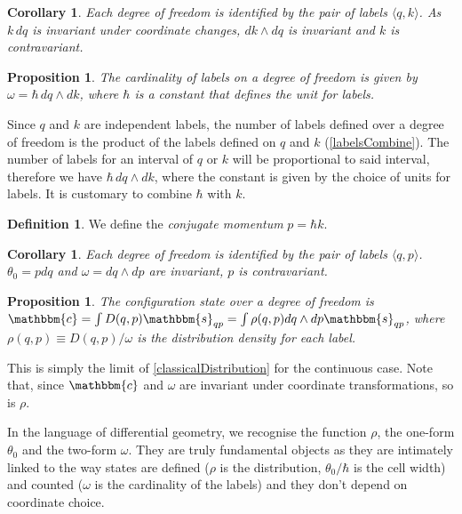 \documentclass[aps,pra,10pt,twocolumn,floatfix,nofootinbib]{revtex4-1}
\newtheorem{cor}[thm]{Corollary}
\newtheorem{prop}[thm]{Proposition}
\theoremstyle{definition}
\newtheorem{defn}[thm]{Definition}
\begin{document}
\begin{cor}\label{continuousLabels}
Each degree of freedom is identified by the pair of labels $\langle q,k \rangle$. As $k\,dq$ is invariant under coordinate changes, $dk\wedge dq$ is invariant and $k$ is contravariant.
\end{cor}

\begin{prop}\label{continuousLabels}
The cardinality of labels on a degree of freedom is given by $\omega = \hbar \, dq \wedge dk$, where $\hbar$ is a constant that defines the unit for labels.
\end{prop}

Since $q$ and $k$ are independent labels, the number of labels defined over a degree of freedom is the product of the labels defined on $q$ and $k$ (\ref{labelsCombine}). The number of labels for an interval of $q$ or $k$ will be proportional to said interval, therefore we have $\hbar \, dq \wedge dk$, where the constant is given by the choice of units for labels. It is customary to combine $\hbar$ with $k$.

\begin{defn}\label{sdof}
We define the \emph{conjugate momentum} $p=\hbar k$.
\end{defn}

\begin{cor}\label{continuousLabels}
Each degree of freedom is identified by the pair of labels $\langle q,p \rangle$. $\theta_0 = p dq$ and $\omega = dq \wedge dp$ are invariant, $p$ is contravariant.
\end{cor}

\begin{prop}\label{continuousLabelDist}
The configuration state over a degree of freedom is $\mathbbm{c}=\int D(q,p) \mathbbm{s}_{qp} = \int \rho(q,p) dq \wedge dp \mathbbm{s}_{qp}$, where $\rho(q,p)\equiv D(q,p) / \omega$ is the distribution density for each label.
\end{prop}

This is simply the limit of \ref{classicalDistribution} for the continuous case. Note that, since $\mathbbm{c}$ and $\omega$ are invariant under coordinate transformations, so is $\rho$.

In the language of differential geometry, we recognise the function $\rho$, the one-form $\theta_0$ and the two-form $\omega$. They are truly fundamental objects as they are intimately linked to the way states are defined ($\rho$ is the distribution, $\theta_0 / \hbar$ is the cell width) and counted ($\omega$ is the cardinality of the labels) and they don't depend on coordinate choice.
\end{document}
